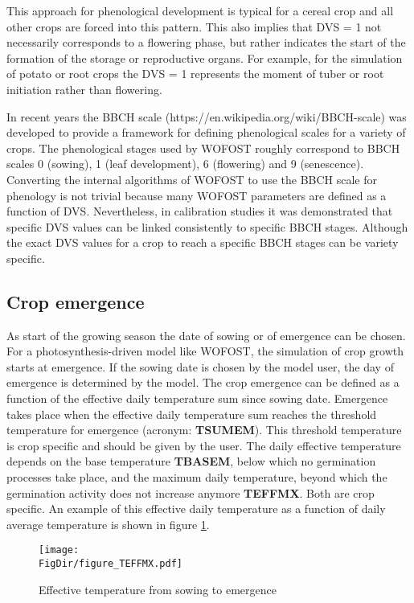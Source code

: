 This approach for phenological development is typical for a cereal crop and all other crops are forced 
into this pattern. This also implies that DVS = 1 not necessarily corresponds to a flowering phase, 
but rather indicates the start of the formation of the storage or reproductive organs. For example, for the 
simulation of potato or root crops the DVS = 1 represents the moment of tuber or root initiation rather 
than flowering.

In recent years the BBCH scale (https://en.wikipedia.org/wiki/BBCH-scale) was developed to provide 
a framework for defining phenological scales for a variety of crops. The phenological stages
used by WOFOST roughly correspond to BBCH scales 0 (sowing), 1 (leaf development), 6 (flowering)
and 9 (senescence). Converting the internal algorithms of WOFOST to use the BBCH scale for phenology is 
not trivial because many WOFOST parameters are defined as a function of DVS. Nevertheless,
in calibration studies it was demonstrated that specific DVS values can be linked consistently
to specific BBCH stages. Although the exact DVS values for a crop to reach a specific BBCH
stages can be variety specific.


\subsection{Crop emergence}

As start of the growing season the date of sowing or of emergence can be chosen. For a
photosynthesis-driven model like WOFOST, the simulation of crop growth starts at
emergence. If the sowing date is chosen by the model user, the day of emergence is
determined by the model. The crop emergence can be
defined as a function of the effective daily temperature sum since sowing date. Emergence
takes place when the effective daily temperature sum reaches the threshold temperature
for emergence (acronym: {\bf TSUMEM}). This threshold temperature is crop specific and
should be given by the user. The daily effective temperature depends on the base
temperature {\bf TBASEM}, below which no germination processes take place, and the maximum daily
temperature, beyond which the germination activity does not increase anymore {\bf TEFFMX}.
Both are crop specific. An example of this effective daily temperature as a function of daily
average temperature is shown in figure \ref{fig:TEFFMAX}.

\begin{figure}[p]
	\centering
	\texttt{[image: \\FigDir/figure\_TEFFMX.pdf]}
	\caption{Effective temperature from sowing to emergence} 
	\label{fig:TEFFMAX}
\end{figure}

